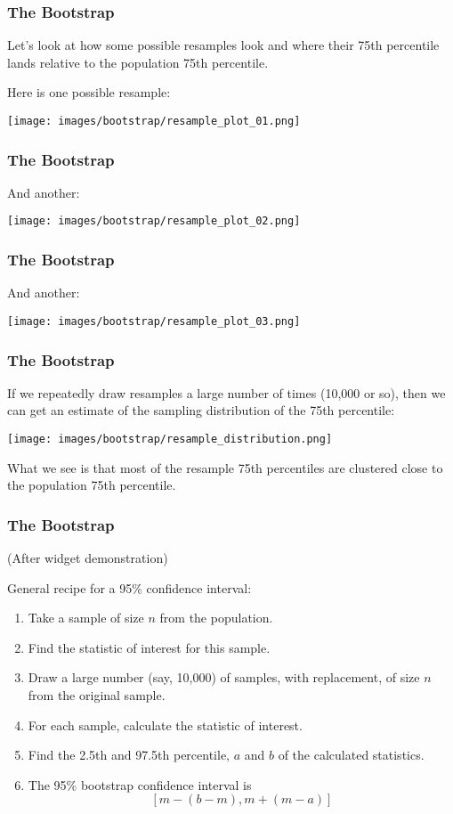 \documentclass[11pt, table]{beamer}
\begin{document}
\begin{frame}
\frametitle{The Bootstrap}
Let's look at how some possible resamples look and where their 75th percentile lands relative to the population 75th percentile.
\vspace{0.1in}

Here is one possible resample:
\begin{center}
	\texttt{[image: images/bootstrap/resample\_plot\_01.png]}
\end{center}
\end{frame}

\begin{frame}
\frametitle{The Bootstrap}
And another:
\begin{center}
	\texttt{[image: images/bootstrap/resample\_plot\_02.png]}
\end{center}
\end{frame}

\begin{frame}
\frametitle{The Bootstrap}
And another:
\begin{center}
	\texttt{[image: images/bootstrap/resample\_plot\_03.png]}
\end{center}
\end{frame}

\begin{frame}
\frametitle{The Bootstrap}
If we repeatedly draw resamples a large number of times (10,000 or so), then we can get an estimate of the sampling distribution of the 75th percentile:

\begin{center}
	\texttt{[image: images/bootstrap/resample\_distribution.png]}
\end{center}

What we see is that most of the resample 75th percentiles are clustered close to the population 75th percentile.
\end{frame}

\begin{frame}
\frametitle{The Bootstrap}
(After widget demonstration)

General recipe for a 95\% confidence interval:
\begin{enumerate}
	\item Take a sample of size $n$ from the population.
	\item Find the statistic of interest for this sample.
	\item Draw a large number (say, 10,000) of samples, with replacement, of size $n$ from the original sample.
	\item For each sample, calculate the statistic of interest. 
	\item Find the 2.5th and 97.5th percentile, $a$ and $b$ of the calculated statistics.
	\item The 95\% bootstrap confidence interval is
$$[m - (b - m), m + (m - a)]$$
\end{enumerate}
\end{frame}
\end{document}
